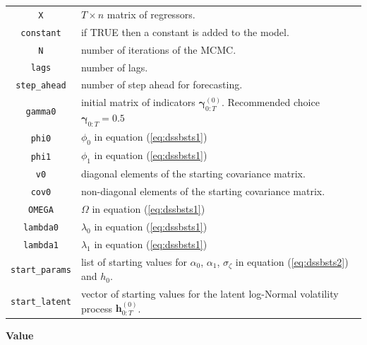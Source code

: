 \documentclass[
  12pt,
]{book}
\theoremstyle{break}
\theoremstyle{nonumberplain}
\begin{document}
\begin{small}
\begin{longtable}{ c l }
\texttt{X} &  $T \times n$ matrix of regressors.\\
\texttt{constant} & if TRUE then a constant is added to the model.\\
\texttt{N} &  number of iterations of the MCMC. \\
\texttt{lags} & number of lags.\\
\texttt{step\_ahead} & number of step ahead for forecasting.\\
\texttt{gamma0} &  initial matrix of indicators $\boldsymbol{\gamma}^{(0)}_{0:T}$. Recommended choice $\boldsymbol{\gamma}_{0:T}=0.5$\\
\texttt{phi0} & $\phi_{0}$ in equation (\ref{eq:dssbsts1})\\
\texttt{phi1} &  $\phi_1$ in equation (\ref{eq:dssbsts1})\\
\texttt{v0} & diagonal elements of the starting covariance matrix.\\
\texttt{cov0} & non-diagonal elements of the starting covariance matrix.\\
\texttt{OMEGA} &  $\Omega$ in equation (\ref{eq:dssbsts1})\\
\texttt{lambda0} &  $\lambda_0$ in equation (\ref{eq:dssbsts1})\\
\texttt{lambda1} &  $\lambda_1$ in equation (\ref{eq:dssbsts1})\\
\texttt{start\_params} &  list of starting values for $\alpha_0$, $\alpha_1$, $\sigma_\zeta$ in equation (\ref{eq:dssbsts2}) and $h_0$.\\
\texttt{start\_latent} &  vector of starting values for the latent log-Normal volatility process $\boldsymbol{h}^{(0)}_{0:T}$.
\end{longtable}
\end{small}

\textbf{Value}
\end{document}
